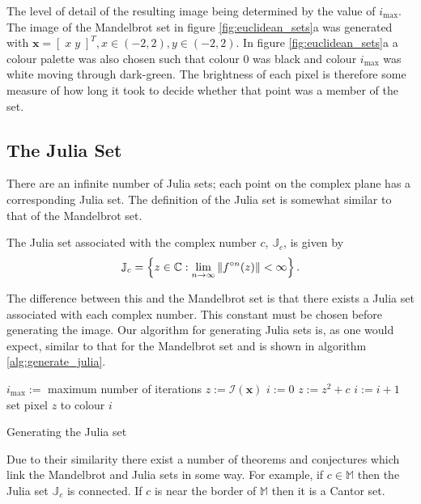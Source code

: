 The level of detail of the resulting image being determined by the value of $i_{\mathrm{max}}$.
The image of the Mandelbrot set in figure \ref{fig:euclidean_sets}a was
generated with $\mathbf{x} = [\;x\;y\;]^T, x \in (-2,2), y \in (-2,2)$.
In figure \ref{fig:euclidean_sets}a a colour palette was also chosen such that colour 0 was black
and colour $i_{\mathrm{max}}$ was white moving through dark-green. The brightness of
each pixel is therefore some measure of how long it took to decide whether that point was
a member of the set.

\subsection{The Julia Set}

There are an infinite number of Julia sets; each point on the complex plane
has a corresponding Julia set. The definition of the Julia set is somewhat
similar to that of the Mandelbrot set.

\begin{definition}
The Julia set associated
with the complex number $c$, $\mathbb{J}_c$, is given by
\[
\mathbb{J}_c = 
\left\{z \in \mathbb{C}
: \lim_{n \rightarrow \infty} \left\Vert f^{\circ n}(z) \right\Vert < \infty \right\}.
\]
\end{definition}

The difference between this and the Mandelbrot set is that there exists a 
Julia set associated with each complex number. This constant must be chosen before
generating the image. Our algorithm for generating Julia sets is, as one would
expect, similar to that for the Mandelbrot set and is shown in algorithm
\ref{alg:generate_julia}.

\begin{fancyalg}
\begin{algorithmic}[1]
\STATE $i_{\mathrm{max}} :=$ maximum number of iterations
\STATE $z := {\mathcal I}(\mathbf{x})$
\STATE $i := 0$
  \STATE $z := z^2 + c$
  \STATE $i := i+1$
\ENDWHILE 
\STATE set pixel $z$ to colour $i$
\ENDFOR
\end{algorithmic}
\caption{
\label{alg:generate_julia}
  Generating the Julia set}
\end{fancyalg}

Due to their similarity there exist a number of theorems and conjectures which link the
Mandelbrot and Julia sets in some way. For example, if $c \in \mathbb{M}$ then
the Julia set $\mathbb{J}_c$ is connected\cite{FRAC:JuliaAndMandelbrotSets}.
If $c$ is near the border of $\mathbb{M}$ then it is a Cantor
set\cite{FRAC:JuliaAndMandelbrotSets}.

